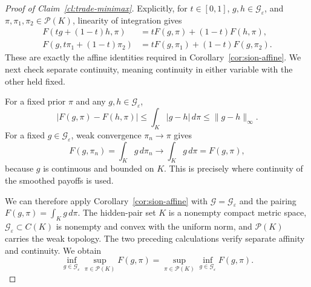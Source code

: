 \documentclass[11pt]{article}
\begin{document}
\begin{proof}[Proof of Claim~\ref{cl:trade-minimax}]
{
Explicitly, for $t\in[0,1]$, $g,h\in\mathcal G_\varepsilon$, and $\pi,\pi_1,\pi_2\in\mathcal P(K)$, linearity of integration gives
\[
 \begin{aligned}
 F(tg+(1-t)h,\pi)
 &=tF(g,\pi)+(1-t)F(h,\pi),\\
 F(g,t\pi_1+(1-t)\pi_2)
 &=tF(g,\pi_1)+(1-t)F(g,\pi_2).
 \end{aligned}
\]
These are exactly the affine identities required in Corollary~\ref{cor:sion-affine}. We next check separate continuity, meaning continuity in either variable with the other held fixed.
}

For a fixed prior $\pi$ and any $g,h\in\mathcal G_\varepsilon$,
\[
 |F(g,\pi)-F(h,\pi)|
 \le\int_K|g-h|\,d\pi
 \le\|g-h\|_\infty.
\]
For a fixed $g\in\mathcal G_\varepsilon$, weak convergence $\pi_n\to\pi$ gives
\[
 F(g,\pi_n)=\int_Kg\,d\pi_n
 \longrightarrow\int_Kg\,d\pi=F(g,\pi),
\]
because $g$ is continuous and bounded on $K$. This is precisely where continuity of the smoothed payoffs is used.

{
We can therefore apply Corollary~\ref{cor:sion-affine} with $\mathcal G=\mathcal G_\varepsilon$ and the pairing $F(g,\pi)=\int_Kg\,d\pi$. The hidden-pair set $K$ is a nonempty compact metric space, $\mathcal G_\varepsilon\subset C(K)$ is nonempty and convex with the uniform norm, and $\mathcal P(K)$ carries the weak topology. The two preceding calculations verify separate affinity and continuity.  We obtain
}
\[
 \inf_{g\in\mathcal G_\varepsilon}\sup_{\pi\in\mathcal P(K)}F(g,\pi)
 =\sup_{\pi\in\mathcal P(K)}\inf_{g\in\mathcal G_\varepsilon}F(g,\pi).
\]


\end{proof}
\end{document}
